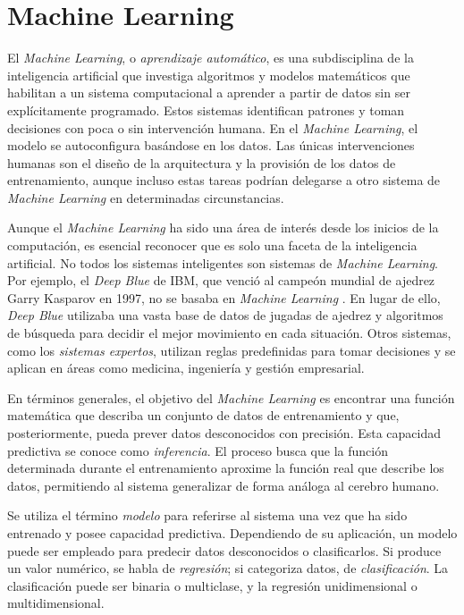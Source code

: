 \section{Machine Learning}

El \textit{Machine Learning}, o \textit{aprendizaje automático}, es una subdisciplina de la inteligencia artificial que investiga algoritmos y modelos matemáticos que habilitan a un sistema computacional a aprender a partir de datos sin ser explícitamente programado. Estos sistemas identifican patrones y toman decisiones con poca o sin intervención humana. En el \textit{Machine Learning}, el modelo se autoconfigura basándose en los datos. Las únicas intervenciones humanas son el diseño de la arquitectura y la provisión de los datos de entrenamiento, aunque incluso estas tareas podrían delegarse a otro sistema de \textit{Machine Learning} en determinadas circunstancias.

Aunque el \textit{Machine Learning} ha sido una área de interés desde los inicios de la computación, es esencial reconocer que es solo una faceta de la inteligencia artificial. No todos los sistemas inteligentes son sistemas de \textit{Machine Learning}. Por ejemplo, el \textit{Deep Blue} de IBM, que venció al campeón mundial de ajedrez Garry Kasparov en 1997, no se basaba en \textit{Machine Learning} \citep{campbellDeepBlue2002}. En lugar de ello, \textit{Deep Blue} utilizaba una vasta base de datos de jugadas de ajedrez y algoritmos de búsqueda para decidir el mejor movimiento en cada situación. Otros sistemas, como los \emph{sistemas expertos}, utilizan reglas predefinidas para tomar decisiones y se aplican en áreas como medicina, ingeniería y gestión empresarial.

En términos generales, el objetivo del \textit{Machine Learning} es encontrar una función matemática que describa un conjunto de datos de entrenamiento y que, posteriormente, pueda prever datos desconocidos con precisión. Esta capacidad predictiva se conoce como \textit{inferencia}. El proceso busca que la función determinada durante el entrenamiento aproxime la función real que describe los datos, permitiendo al sistema generalizar de forma análoga al cerebro humano.

Se utiliza el término \textit{modelo} para referirse al sistema una vez que ha sido entrenado y posee capacidad predictiva. Dependiendo de su aplicación, un modelo puede ser empleado para predecir datos desconocidos o clasificarlos. Si produce un valor numérico, se habla de \textit{regresión}; si categoriza datos, de \textit{clasificación}. La clasificación puede ser binaria o multiclase, y la regresión unidimensional o multidimensional.

